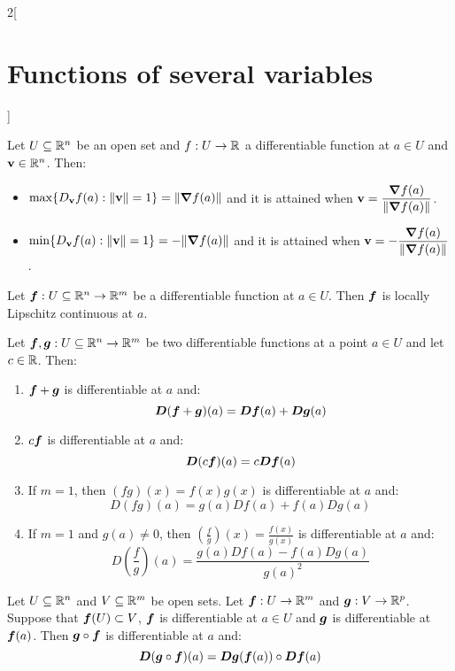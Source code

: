\documentclass[../../../main.tex]{subfiles}
\begin{document}
\begin{multicols}{2}[\section{Functions of several variables}]
\begin{prop}
  \end{prop}
  \begin{prop}
    Let $U\subseteq\mathbb{R}^n$ be an open set and $f:U\rightarrow\mathbb{R} $ a differentiable function at $a\in U$ and $\vb{v}\in\mathbb{R}^n$. Then:
    \begin{itemize}
      \item $\displaystyle\max\{D_{\vb{v}}f(a):\|\vb{v}\|=1\}=\|\grad f(a)\|$ and it is attained when $\displaystyle \vb{v}=\frac{\grad f(a)}{\|\grad f(a)\|}$.
      \item $\displaystyle\min\{D_{\vb{v}}f(a):\|\vb{v}\|=1\}=-\|\grad f(a)\|$ and it is attained when $\displaystyle \vb{v}=-\frac{\grad f(a)}{\|\grad f(a)\|}$.
    \end{itemize}
  \end{prop}
  \begin{theorem}
    Let $\boldsymbol{f}:U\subseteq\mathbb{R}^n\rightarrow\mathbb{R}^m$ be a differentiable function at $a\in U$. Then $\boldsymbol{f}$ is locally Lipschitz continuous at $a$.
  \end{theorem}
  \begin{theorem}
    Let $\boldsymbol{f},\boldsymbol{g}:U\subseteq\mathbb{R}^n\to\mathbb{R}^m$ be two differentiable functions at a point $a\in U$ and let $c\in\mathbb{R} $. Then:
    \begin{enumerate}
      \item $\boldsymbol{f}+\boldsymbol{g}$ is differentiable at $a$ and: $$\boldsymbol{D}(\boldsymbol{f}+\boldsymbol{g})(a)=\boldsymbol{Df}(a)+\boldsymbol{Dg}(a)$$
      \item $c\boldsymbol{f}$ is differentiable at $a$ and:
            $$\boldsymbol{D}(c\boldsymbol{f})(a)=c\boldsymbol{Df}(a)$$
      \item If $m=1$, then $(fg)(x)=f(x)g(x)$ is differentiable at $a$ and: $$D(fg)(a)=g(a)Df(a)+f(a)Dg(a)$$
      \item If $m=1$ and $g(a)\ne0$, then $\displaystyle\left(\frac{f}{g}\right)(x)=\frac{f(x)}{g(x)}$ is differentiable at $a$ and: $$D\left(\frac{f}{g}\right)(a)=\frac{g(a)Df(a)-f(a)Dg(a)}{{g(a)}^2}$$
    \end{enumerate}
  \end{theorem}
  \begin{theorem}
    Let $U\subseteq\mathbb{R}^n$ and $V\subseteq\mathbb{R}^m$ be open sets. Let $\boldsymbol{f}:U\rightarrow\mathbb{R}^m$ and $\boldsymbol{g}:V\rightarrow\mathbb{R}^p$. Suppose that $\boldsymbol{f}(U)\subset V$, $\boldsymbol{f}$ is differentiable at $a\in U$ and $\boldsymbol{g}$ is differentiable at $\boldsymbol{f}(a)$. Then $\boldsymbol{g}\circ \boldsymbol{f}$ is differentiable at $a$ and: $$\boldsymbol{D}(\boldsymbol{g}\circ \boldsymbol{f})(a)=\boldsymbol{Dg}(\boldsymbol{f}(a))\circ \boldsymbol{Df}(a)$$

\end{theorem}
\end{multicols}
\end{document}
